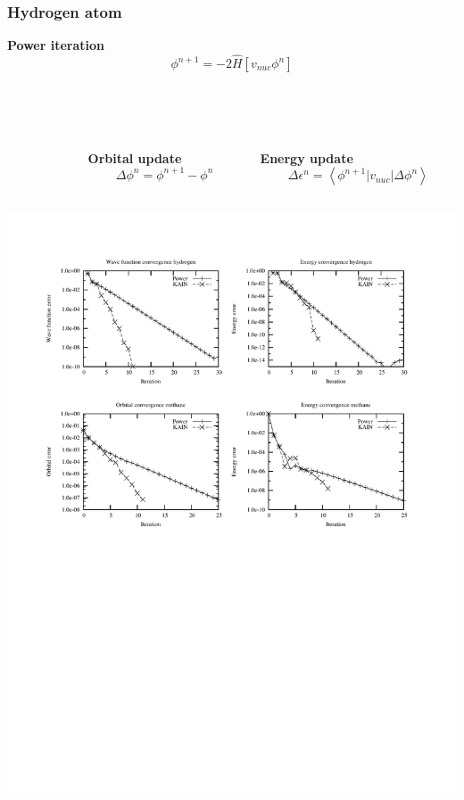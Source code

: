 \begin{frame}
    \frametitle{Hydrogen atom}
    \centering
    \textbf{Power iteration}
    \begin{equation}
	\nonumber
	\phi^{n+1} = -2\hat{H}\left[v_{nuc}\phi^n\right]
    \end{equation}
    \ \\
    \ \\
    \ \\
    \begin{columns}
    \begin{column}{.10\textwidth}
    \ \\
    \end{column}
    \begin{column}{.40\textwidth}
    \centering
    \textbf{Orbital update}
    \begin{equation}
	\nonumber
	\Delta\phi^n = \phi^{n+1} - \phi^n
    \end{equation}
    \end{column}
    \begin{column}{.50\textwidth}
    \centering
    \textbf{Energy update}
    \begin{equation}
	\nonumber
	\Delta \epsilon^n = \left<\phi^{n+1}|v_{nuc}|\Delta\phi^n\right>
    \end{equation}
    \end{column}
    \end{columns}    
    \begin{center}
	\includegraphics[scale=0.6, clip, viewport = 50 550 540 730]{figures/convergence.pdf}
    \end{center}
\end{frame}

